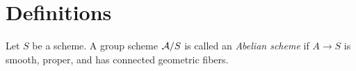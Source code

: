 \documentclass[12pt]{article}
\begin{document}
\section{Definitions}

\begin{defn}
Let $S$ be a scheme. A group scheme $\mathcal{A} / S$ is called an \textit{Abelian scheme} if $A \to S$ is smooth, proper, and has connected geometric fibers.  
\end{defn}
\end{document}
